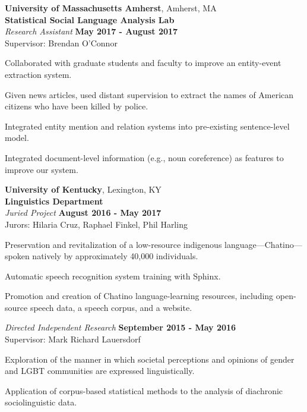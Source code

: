 \documentclass[10pt]{article}
\newcommand{\halfblankline}{\quad\vspace{-0.5\baselineskip}\pagebreak[3]}
\begin{document}
	\halfblankline

	{\textbf{University of Massachusetts Amherst}},
	Amherst, MA\\
	\textbf{Statistical Social Language Analysis Lab}\\
		\textit{Research Assistant}%
		\hfill \textbf{May 2017 - August 2017}\\
		Supervisor: Brendan O'Connor
		\begin{innerlist}
			\item Collaborated with graduate students and faculty to improve an entity-event extraction system.
			\item Given news articles, used distant supervision to extract the names of American citizens who have been killed by police.
			\item Integrated entity mention and relation systems into pre-existing sentence-level model.
			\item Integrated document-level information (e.g., noun coreference) as features to improve our system.
		\end{innerlist}
	
	\halfblankline
	
	{\textbf{University of Kentucky}},
	Lexington, KY\\
	\textbf{Linguistics Department}\\
		\textit{Juried Project}%
		\hfill \textbf{August 2016 - May 2017}\\
		Jurors: Hilaria Cruz, Raphael Finkel, Phil Harling
		\begin{innerlist}
			\item Preservation and revitalization of a low-resource indigenous language---Chatino---spoken natively by approximately 40,000 individuals.
			\item Automatic speech recognition system training with Sphinx.
			\item Promotion and creation of Chatino language-learning resources, including open-source speech data, a speech corpus, and a website.
		\end{innerlist}
	
	\halfblankline
	
		\textit{Directed Independent Research}
		\hfill \textbf{September 2015 - May 2016}\\
		Supervisor: Mark Richard Lauersdorf
		\begin{innerlist}
			\item Exploration of the manner in which societal perceptions and opinions of gender and LGBT communities are expressed linguistically.
			\item Application of corpus-based statistical methods to the analysis of diachronic sociolinguistic data.
		\end{innerlist}
\end{document}
